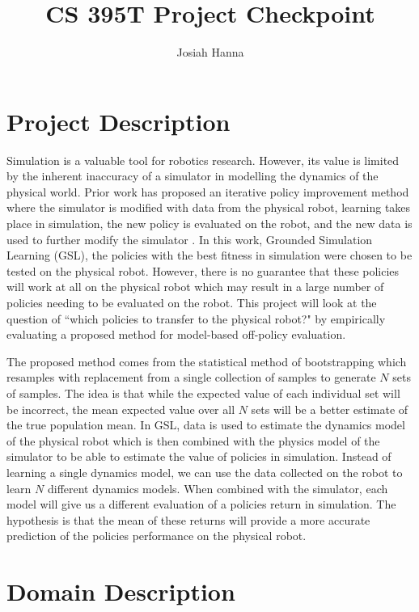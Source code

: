 \documentclass[12 pt,two column]{article}
\author{Josiah Hanna}
\title{CS 395T Project Checkpoint}
\begin{document}
\maketitle

\section{Project Description}

Simulation is a valuable tool for robotics research. However, its value is limited by the inherent inaccuracy of a simulator in modelling the dynamics of the physical world. Prior work has proposed an iterative policy improvement method where the simulator is modified with data from the physical robot, learning takes place in simulation, the new policy is evaluated on the robot, and the new data is used to further modify the simulator \cite{farchy2013humanoid}. In this work, Grounded Simulation Learning (GSL), the policies with the best fitness in simulation were chosen to be tested on the physical robot. However, there is no guarantee that these policies will work at all on the physical robot which may result in a large number of policies needing to be evaluated on the robot. This project will look at the question of ``which policies to transfer to the physical robot?" by empirically evaluating a proposed method for model-based off-policy evaluation.

The proposed method comes from the statistical method of bootstrapping which resamples with replacement from a single collection of samples to generate $N$ sets of samples. The idea is that while the expected value of each individual set will be incorrect, the mean expected value over all $N$ sets will be a better estimate of the true population mean. In GSL, data is used to estimate the dynamics model of the physical robot which is then combined with the physics model of the simulator to be able to estimate the value of policies in simulation. Instead of learning a single dynamics model, we can use the data collected on the robot to learn $N$ different dynamics models. When combined with the simulator, each model will give us a different evaluation of a policies return in simulation. The hypothesis is that the mean of these returns will provide a more accurate prediction of the policies performance on the physical robot.


\section{Domain Description}
\end{document}
